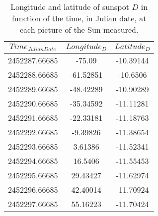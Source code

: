 \begin{table}[H]
	\centering
	\begin{tabular}{ c  c  c }
		\\\hline
		\centering
			$Time_{Julian Date}$ & $Longitude_{D}$ & $Latitude_{D}$ \\\hline
			2452287.66685 & -75.09 & -10.39144 \\
			2452288.66685 & -61.52851 & -10.6506 \\
			2452289.66685 & -48.42289 & -10.90289 \\
			2452290.66685 & -35.34592 & -11.11281 \\
			2452291.66685 & -22.33181 & -11.18763 \\
			2452292.66685 & -9.39826 & -11.38654 \\
			2452293.66685 & 3.61386 & -11.52341 \\
			2452294.66685 & 16.5406 & -11.55453 \\
			2452295.66685 & 29.43427 & -11.62974 \\
			2452296.66685 & 42.40014 & -11.70924 \\
			2452297.66685 & 55.16223 & -11.70424 \\\hline
	\end{tabular}
	\caption{\label{Tab:sunspotD}Longitude and latitude of sunspot $D$ in function of the time, in Julian date, at each picture of the Sun measured.}
\end{table}
